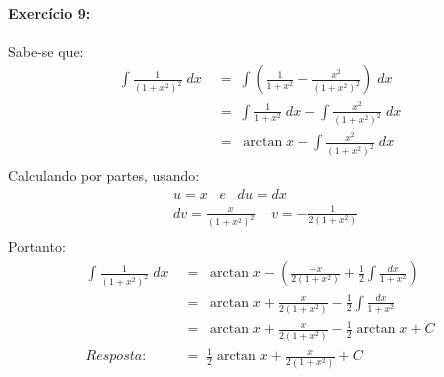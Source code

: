 \documentclass[12pt]{article}
\begin{document}

\paragraph{Exercício 9:}
Sabe-se que:
\begin{align*}
\int \frac{1}{\left ( 1+x^{2} \right )^{2}}\; dx &\;=\; \int \left ( \frac{1}{1+x^{2}}-\frac{x^{2}}{\left ( 1+x^{2} \right )^{2}} \right )\; dx\\
&\;=\; \int \frac{1}{1+x^{2}}\;dx-\int \frac{x^{2}}{\left ( 1+x^{2} \right )^{2}}\;dx \\
&\;=\; \arctan x - \int \frac{x^{2}}{\left ( 1+x^{2} \right )^{2}}\;dx\\
\end{align*}
Calculando por partes, usando:
\begin{align*}
&u = x \;\;\; e \;\;\; du = dx\\
&dv = \frac{x}{\left ( 1+x^{2} \right )^{2}} \;\;\;\; v= -\frac{1}{2\left ( 1+x^{2} \right )}\\
\end{align*}
Portanto:
\begin{align*}
\int \frac{1}{\left ( 1+x^{2} \right )^{2}}\; dx &\;=\;\arctan x -\left ( \frac{-x}{2\left ( 1+x^{2} \right )} +\frac{1}{2}\int\frac{dx}{1+x^{2}} \right )\\
&\;=\;\arctan x + \frac{x}{2\left ( 1+x^{2} \right )}-\frac{1}{2}\int \frac{dx}{1+x^{2}}\\
&\;=\;\arctan x + \frac{x}{2\left ( 1+x^{2} \right )}-\frac{1}{2}\arctan x+C\\
Resposta: &\;=\;\frac{1}{2}\arctan x+\frac{x}{2\left ( 1+x^{2} \right )}+C\\\\\\\\\\\\
\end{align*}

\end{document}
